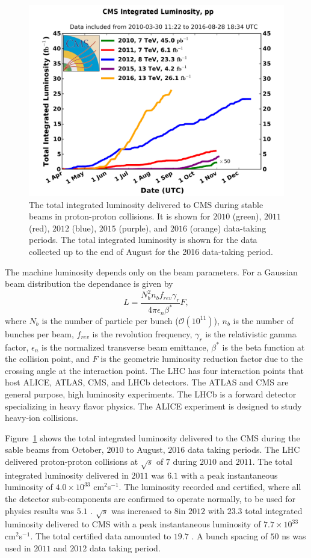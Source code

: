 \begin{figure}[h]
\centering
\includegraphics[width=0.60\columnwidth]{figures_chapter2/int_lumi_cumulative_pp_2}
\caption{The total integrated luminosity delivered to CMS during stable beams in proton-proton collisions\cite{lumi_plot}. It is shown for $2010$ (green), $2011$ (red), $2012$ (blue), $2015$ (purple), and $2016$ (orange) data-taking periods. The total integrated luminosity is shown for the data collected up to the end of August for the 2016 data-taking period.} 
\label{fig:int}
\end{figure}

The machine luminosity depends only on the beam parameters. For a Gaussian beam distribution the dependance is given by
\begin{equation} \label{eq:lumi_beam}
L = \frac{N_{b}^2n_bf_{rev}\gamma_{r}}{4\pi\epsilon_n\beta^{*}}F,
\end{equation}
where $N_b$ is the number of particle per bunch ($\mathcal{O}(10^{11})$), $n_b$ is the number of bunches per beam, $f_{rev}$ is the revolution frequency, $\gamma_r$ is the relativistic gamma factor, $\epsilon_n$ is the normalized transverse beam emittance, $\beta^{*}$ is the beta function at the collision point, and $F$ is the geometric luminosity reduction factor due to the crossing angle at the interaction point.  The LHC has four interaction points that host ALICE\cite{Aamodt:2008zz}, ATLAS\cite{Aad:2008zzm}, CMS\cite{Chatrchyan:2008aa}, and LHCb\cite{Alves:2008zz} detectors. The ATLAS and CMS are general purpose, high luminosity experiments. The LHCb is a forward detector specializing in heavy flavor physics. The ALICE experiment is designed to study heavy-ion collisions.   


Figure~\ref{fig:int} shows the total integrated luminosity delivered to the CMS during the sable beams from October, $2010$ to August, $2016$ data taking periods. The LHC delivered proton-proton collisions at $\sqrt{s}$ of $7$ \TeV during $2010$ and $2011$. The total integrated luminosity delivered in $2011$ was $6.1$ \ifb with a peak instantaneous luminosity of $4.0 \times 10^{33}$ cm$^2$s$^{-1}$. The luminosity recorded and certified, where all the detector sub-components are confirmed to operate normally, to be used for physics results was $5.1$ \ifb. $\sqrt{s}$ was increased to $8$\TeV in $2012$ with $23.3$ \ifb total integrated luminosity delivered to CMS with a peak instantaneous luminosity of $7.7 \times 10^{33}$ cm$^2$s$^{-1}$. The total certified data amounted to $19.7$ \ifb. A bunch spacing of $50$ ns was used in $2011$ and $2012$ data taking period. 

